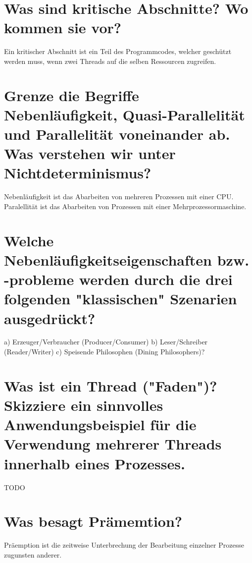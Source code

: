 \documentclass[12pt,a4paper,ngerman]{scrartcl}
\newcommand{\question}[1]{#1}
\newenvironment {answer}
                {}
                {}
\begin{document}
\section{\question{Was sind kritische Abschnitte? Wo kommen sie vor?}}
\begin{answer}
Ein kritischer Abschnitt ist ein Teil des Programmcodes, welcher geschützt werden muss, wenn zwei Threads auf die selben Ressourcen zugreifen.
\end{answer}

\section{\question{Grenze die Begriffe Nebenläufigkeit, Quasi-Parallelität und Parallelität voneinander ab. Was verstehen wir unter Nichtdeterminismus?}}
\begin{answer}
Nebenläufigkeit ist das Abarbeiten von mehreren Prozessen mit einer CPU. Paralellität ist das
Abarbeiten von Prozessen mit einer Mehrprozessormaschine.
\end{answer}

\section{\question{Welche Nebenläufigkeitseigenschaften bzw. -probleme werden durch die drei folgenden "klassischen" Szenarien ausgedrückt?}}
\begin{answer}
a) Erzeuger/Verbraucher (Producer/Consumer)
b) Leser/Schreiber (Reader/Writer)
c) Speisende Philosophen (Dining Philosophers)?
\end{answer}

\section{\question{Was ist ein Thread ("Faden")? Skizziere ein sinnvolles Anwendungsbeispiel für die Verwendung mehrerer Threads innerhalb eines Prozesses.}}
\begin{answer}
TODO 
\end{answer}

\section{\question{Was besagt Prämemtion?}}
\begin{answer}
Präemption ist die zeitweise Unterbrechung der Bearbeitung einzelner Prozesse zugunsten anderer.
\end{answer}
\end{document}
